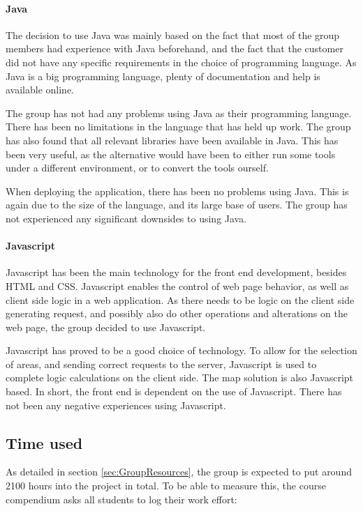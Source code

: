 \documentclass[11pt,a4paper,titlepage,oneside]{report}
\begin{document}
\paragraph{Java}
The decision to use Java was mainly based on the fact that most of the group members had experience with Java beforehand, and the fact that the customer did not have any specific requirements in the choice of programming language. As Java is a big programming language, plenty of documentation and help is available online. 

The group has not had any problems using Java as their programming language. There has been no limitations in the language that has held up work. The group has also found that all relevant libraries have been available in Java. This has been very useful, as the alternative would have been to either run some tools under a different environment, or to convert the tools ourself. 

When deploying the application, there has been no problems using Java. This is again due to the size of the language, and its large base of users. The group has not experienced any significant downsides to using Java. 

\paragraph{Javascript}
Javascript has been the main technology for the front end development, besides \gls{HTML} and \gls{CSS}. Javascript enables the control of web page behavior, as well as client side logic in a web application. As there needs to be logic on the client side generating request, and possibly also do other operations and alterations on the web page, the group decided to use Javascript. 

Javascript has proved to be a good choice of technology. To allow for the selection of areas, and sending correct requests to the server, Javascript is used to complete logic calculations on the client side. The map solution is also Javascript based. In short, the front end is dependent on the use of Javascript. There has not been any negative experiences using Javascript. 

\subsection{Time used}
\label{subsec:TimeUsed}
As detailed in section \ref{sec:GroupResources}, the group is expected to put around 2100 hours into the project in total. To be able to measure this, the course compendium asks all students to log their work effort:
\end{document}
